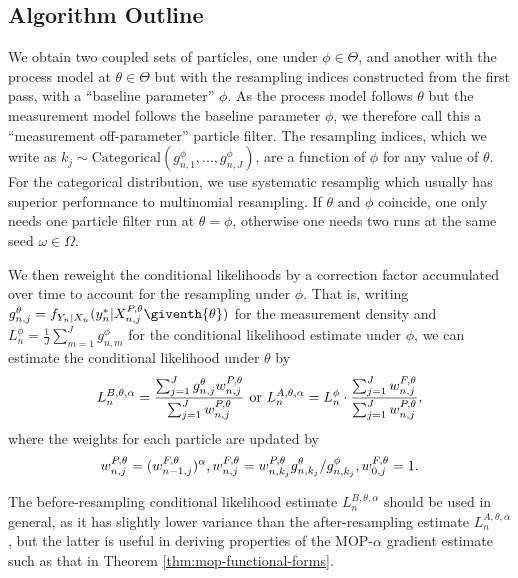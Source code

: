 \documentclass[11pt]{article}
\begin{document}
\subsection{Algorithm Outline} 
We obtain two coupled sets of particles, one under $\phi \in \Theta$, and another with the process model at $\theta \in \Theta$ but with the resampling indices constructed from the first pass, with a ``baseline parameter'' $\phi$.
As the process model follows $\theta$ but the measurement model follows the baseline parameter $\phi$, we therefore call this a ``measurement off-parameter'' particle filter.
The resampling indices, which we write as $k_j \sim \text{Categorical}(g^{\phi}_{n,1},...,g^{\phi}_{n,J})$, are a function of $\phi$ for any value of $\theta$.
For the categorical distribution, we use systematic resamplig \cite{arulampalam02,king16} which usually has superior performance to multinomial resampling.
If $\theta$ and $\phi$ coincide, one only needs one particle filter run at $\theta=\phi$, otherwise one needs two runs at the same seed $\omega \in \Omega$.

We then reweight the conditional likelihoods by a correction factor accumulated over time to account for the resampling under $\phi$. That is, writing $g^{\theta}_{n,j}={f}_{{Y}_{n}|{X}_{n}}(y_{n}^{*}|{X}_{n,j}^{P,\theta}\giventh{\theta})$ for the measurement density and $L_n^{\phi} = \frac{1}{J}\sum_{m=1}^{J}g^{\phi}_{n,m}$ for the conditional likelihood estimate under $\phi$,  we can estimate the conditional likelihood under $\theta$ by
\vspace*{-1.5mm}
\begin{equation}
     \label{eq:mop-conditional-likelihood}
     L_n^{B,\theta,\alpha} = \frac{\sum_{j=1}^Jg^\theta_{n,j} w^{P,\theta}_{n,j}}{\sum_{j=1}^J  w^{P,\theta}_{n,j}} \text{ or } L_n^{A,\theta,\alpha} = L_n^\phi\cdot \frac{\sum_{j=1}^J w^{F,\theta}_{n,j}}{\sum_{j=1}^J  w^{P,\theta}_{n,j}},
     \vspace*{-1.5mm}
\end{equation}
where the weights for each particle are updated by
\vspace*{-1.5mm}
\begin{equation}
    \label{eq:weighting-scheme}
    w_{n,j}^{P,\theta} = (w_{n-1,j}^{F,\theta})^\alpha,  w^{F,\theta}_{n,j} = w^{P,\theta}_{n,k_j} { g^{\theta}_{n,k_j}}/{ g^{\phi}_{n,k_j}}, w^{F,\theta}_{0,j}= 1.
    \vspace*{-1.5mm}
\end{equation}

The before-resampling conditional likelihood estimate $L_n^{B,\theta,\alpha}$ should be used in general, as it has slightly lower variance than the after-resampling estimate $L_n^{A,\theta,\alpha}$, but the latter is useful in deriving properties of the MOP-$\alpha$ gradient estimate such as that in Theorem \ref{thm:mop-functional-forms}.
\end{document}
